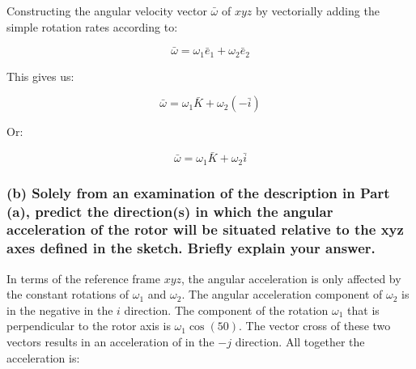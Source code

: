 \documentclass[12pt, letterpaper]{../assignment}
\begin{document}
\begin{center}
\end{center}

Constructing the angular velocity vector $\bar{\omega}$ of $xyz$ by vectorially adding the simple rotation rates according to:

$$ \bar{\omega} = \omega_1 \bar{e}_1 + \omega_2 \bar{e}_2$$

This gives us:

$$ \bar{\omega} = \omega_1 \bar{K} + \omega_2 (-\bar{i})$$

Or:

\begin{answer}
$$ \bar{\omega} = \omega_1 \bar{K} +  \omega_2 \bar{i}$$
\end{answer}

\subsubsection*{(b) Solely from an examination of the description in Part (a), predict the direction(s) in which the angular acceleration of the rotor will be situated relative to the xyz axes defined in the sketch. Briefly explain your answer.}

In terms of the reference frame $xyz$, the angular acceleration is only affected by the constant rotations of $\omega_1$ and $\omega_2$.
The angular acceleration component of $\omega_2$ is in the negative in the ${i}$ direction.
The component of the rotation $\omega_1$ that is perpendicular to the rotor axis is $\omega_1 \cos(50)$.
The vector cross of these two vectors results in an acceleration of in the $-j$ direction.
All together the acceleration is:
\end{document}
